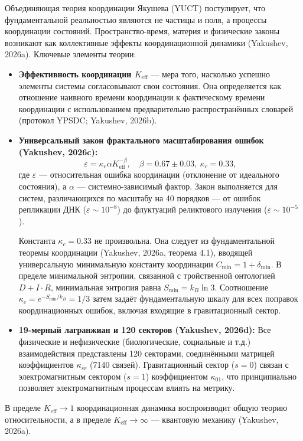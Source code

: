 \documentclass[12pt]{article}
\theoremstyle{remark}
\newcommand{\Keff}{K_{\mathrm{eff}}}
\newcommand{\eps}{\varepsilon}
\newcommand{\kappac}{\kappa_c}
\newcommand{\constmin}{C_{\min}}
\newcommand{\dint}{\ensuremath{D\!+\!I\!\cdot\!R}}
\begin{document}
	Объединяющая теория координации Якушева (YUCT) постулирует, что фундаментальной реальностью являются не частицы и поля, а процессы координации состояний. Пространство-время, материя и физические законы возникают как коллективные эффекты координационной динамики (Yakushev, 2026a). Ключевые элементы теории:
	\begin{itemize}
		\item \textbf{Эффективность координации $\Keff$} — мера того, насколько успешно элементы системы согласовывают свои состояния. Она определяется как отношение наивного времени координации к фактическому времени координации с использованием предварительно распространённых словарей (протокол YPSDC; Yakushev, 2026b).
		\item \textbf{Универсальный закон фрактального масштабирования ошибок (Yakushev, 2026c):}
		\begin{equation}
			\eps = \kappac \alpha \Keff^{-\beta}, \quad \beta = 0.67 \pm 0.03, \ \kappac = 0.33,
			\label{eq:universal-scaling}
		\end{equation}
		где $\eps$ — относительная ошибка координации (отклонение от идеального состояния), а $\alpha$ — системно-зависимый фактор. Закон выполняется для систем, различающихся по масштабу на 40 порядков — от ошибок репликации ДНК ($\eps\sim 10^{-8}$) до флуктуаций реликтового излучения ($\eps\sim 10^{-5}$).
		
		Константа $\kappac = 0.33$ не произвольна. Она следует из фундаментальной теоремы координации (Yakushev, 2026a, теорема 4.1), вводящей универсальную минимальную константу координации $\constmin = 1 + \delta_{\min}$. В пределе минимальной энтропии, связанной с тройственной онтологией $\dint$, минимальная энтропия равна $S_{\min} = k_B \ln 3$. Соотношение $\kappac = e^{-S_{\min}/k_B} = 1/3$ затем задаёт фундаментальную шкалу для всех поправок координационных ошибок, включая входящие в гравитационный сектор.
		
		\item \textbf{19-мерный лагранжиан и 120 секторов (Yakushev, 2026d):} Все физические и нефизические (биологические, социальные и т.д.) взаимодействия представлены 120 секторами, соединёнными матрицей коэффициентов $\kappa_{sr}$ (7140 связей). Гравитационный сектор ($s=0$) связан с электромагнитным сектором ($s=1$) коэффициентом $\kappa_{01}$, что принципиально позволяет электромагнитным процессам влиять на метрику.
	\end{itemize}
	В пределе $\Keff \to 1$ координационная динамика воспроизводит общую теорию относительности, а в пределе $\Keff \to \infty$ — квантовую механику (Yakushev, 2026a).
	
\end{document}
